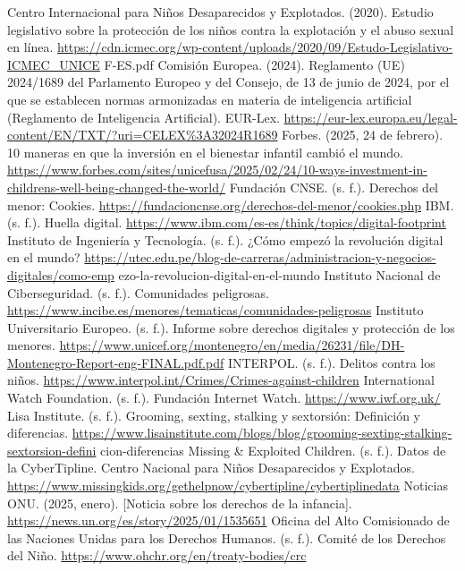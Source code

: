 
\begin{referencelist}
   Centro Internacional para Niños Desaparecidos y Explotados. (2020). Estudio legislativo sobre la protección de los niños contra la explotación y el abuso sexual en línea. \url{https://cdn.icmec.org/wp-content/uploads/2020/09/Estudo-Legislativo-ICMEC_UNICE} F-ES.pdf
   Comisión Europea. (2024). Reglamento (UE) 2024/1689 del Parlamento Europeo y del Consejo, de 13 de junio de 2024, por el que se establecen normas armonizadas en materia de inteligencia artificial (Reglamento de Inteligencia Artificial). EUR-Lex. \url{https://eur-lex.europa.eu/legal-content/EN/TXT/?uri=CELEX\%3A32024R1689}
   Forbes. (2025, 24 de febrero). 10 maneras en que la inversión en el bienestar infantil cambió el mundo. \url{https://www.forbes.com/sites/unicefusa/2025/02/24/10-ways-investment-in-childrens-well-being-changed-the-world/}
   Fundación CNSE. (s. f.). Derechos del menor: Cookies. \url{https://fundacioncnse.org/derechos-del-menor/cookies.php}
   IBM. (s. f.). Huella digital. \url{https://www.ibm.com/es-es/think/topics/digital-footprint}
   Instituto de Ingeniería y Tecnología. (s. f.). ¿Cómo empezó la revolución digital en el mundo? \url{https://utec.edu.pe/blog-de-carreras/administracion-y-negocios-digitales/como-emp} ezo-la-revolucion-digital-en-el-mundo
   Instituto Nacional de Ciberseguridad. (s. f.). Comunidades peligrosas. \url{https://www.incibe.es/menores/tematicas/comunidades-peligrosas}
   Instituto Universitario Europeo. (s. f.). Informe sobre derechos digitales y protección de los menores. \url{https://www.unicef.org/montenegro/en/media/26231/file/DH-Montenegro-Report-eng-FINAL.pdf.pdf}
   INTERPOL. (s. f.). Delitos contra los niños. \url{https://www.interpol.int/Crimes/Crimes-against-children}
   International Watch Foundation. (s. f.). Fundación Internet Watch. \url{https://www.iwf.org.uk/}
   Lisa Institute. (s. f.). Grooming, sexting, stalking y sextorsión: Definición y diferencias. \url{https://www.lisainstitute.com/blogs/blog/grooming-sexting-stalking-sextorsion-defini} cion-diferencias
   Missing \& Exploited Children. (s. f.). Datos de la CyberTipline. Centro Nacional para Niños Desaparecidos y Explotados. \url{https://www.missingkids.org/gethelpnow/cybertipline/cybertiplinedata}
   Noticias ONU. (2025, enero). [Noticia sobre los derechos de la infancia]. \url{https://news.un.org/es/story/2025/01/1535651}
   Oficina del Alto Comisionado de las Naciones Unidas para los Derechos Humanos. (s. f.). Comité de los Derechos del Niño. \url{https://www.ohchr.org/en/treaty-bodies/crc}

\end{referencelist}
